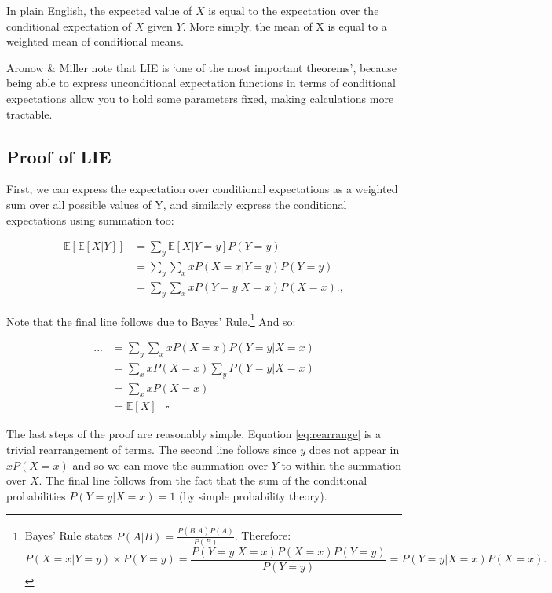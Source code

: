 \documentclass[
]{book}
\begin{document}
In plain English, the expected value of \(X\) is equal to the expectation over the conditional expectation of \(X\) given \(Y\). More simply, the mean of X is equal to a weighted mean of conditional means.

Aronow \& Miller \citeyearpar{aronow2019foundations} note that LIE is `one of the most important theorems', because being able to express unconditional expectation functions in terms of conditional expectations allow you to hold some parameters fixed, making calculations more tractable.

\hypertarget{proof-of-lie}{%
\subsection{Proof of LIE}\label{proof-of-lie}}

First, we can express the expectation over conditional expectations as a weighted sum over all possible values of Y, and similarly express the conditional expectations using summation too:

\begin{align}
    \mathbb{E}[\mathbb{E}[X|Y]] &= \sum_y\mathbb{E}[X|Y=y]P(Y=y) \\
          &= \sum_y\sum_x xP(X=x|Y=y)P(Y=y) \label{eq:lie_expand} \\
          &= \sum_y\sum_x xP(Y=y|X=x)P(X=x). \label{eq:lie_bayes},
\end{align}

Note that the final line follows due to Bayes' Rule.\footnote{Bayes' Rule states \(P(A|B) = \frac{P(B|A)P(A)}{P(B)}\). Therefore:
  \begin{equation*}
  P(X=x|Y=y)\times P(Y=y) = \frac{P(Y=y|X=x)P(X=x) P(Y=y)}{P(Y=y)} = P(Y=y|X=x)P(X=x).
  \end{equation*}} And so:

\begin{align}
    ... &= \sum_y\sum_x xP(X=x)P(Y=y|X=x) \label{eq:rearrange}\\
          &= \sum_x xP(X=x) \sum_y P(Y=y|X=x) \label{eq:shift}\\
          &= \sum_x xP(X=x) \label{eq:equals_one}\\
          &= \mathbb{E}[X] \; \; \; \square
\end{align}

The last steps of the proof are reasonably simple. Equation \ref{eq:rearrange} is a trivial rearrangement of terms. The second line follows since \(y\) does not appear in \(xP(X=x)\) and so we can move the summation over \(Y\) to within the summation over \(X\). The final line follows from the fact that the sum of the conditional probabilities \(P(Y=y|X=x)=1\) (by simple probability theory).
\end{document}
